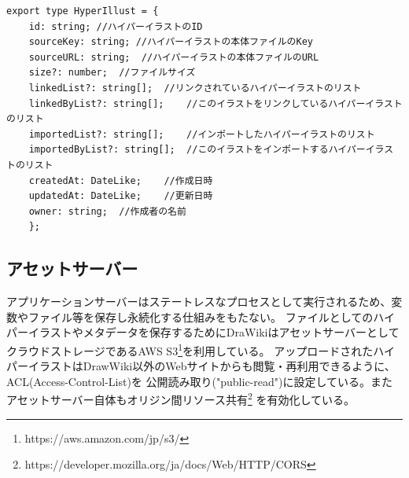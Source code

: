 \begin{lstlisting}[caption=メタデータの概要, label=metadatajson]
    export type HyperIllust = {
    id: string; //ハイパーイラストのID
    sourceKey: string; //ハイパーイラストの本体ファイルのKey
    sourceURL: string;  //ハイパーイラストの本体ファイルのURL
    size?: number;  //ファイルサイズ
    linkedList?: string[];  //リンクされているハイパーイラストのリスト
    linkedByList?: string[];    //このイラストをリンクしているハイパーイラストのリスト
    importedList?: string[];    //インポートしたハイパーイラストのリスト
    importedByList?: string[];  //このイラストをインポートするハイパーイラストのリスト
    createdAt: DateLike;    //作成日時
    updatedAt: DateLike;    //更新日時
    owner: string;  //作成者の名前
    };
\end{lstlisting}

\subsection{アセットサーバー}
アプリケーションサーバーはステートレスなプロセスとして実行されるため、変数やファイル等を保存し永続化する仕組みをもたない。
ファイルとしてのハイパーイラストやメタデータを保存するためにDraWikiはアセットサーバーとして
クラウドストレージであるAWS S3\footnote{https://aws.amazon.com/jp/s3/}を利用している。
アップロードされたハイパーイラストはDrawWiki以外のWebサイトからも閲覧・再利用できるように、ACL(Access-Control-List)を
公開読み取り("public-read")に設定している。またアセットサーバー自体もオリジン間リソース共有\footnote{https://developer.mozilla.org/ja/docs/Web/HTTP/CORS}
を有効化している。

